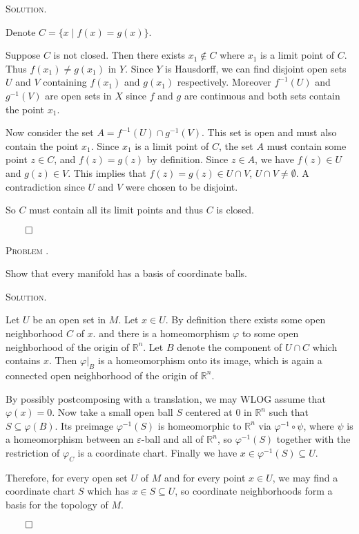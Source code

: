 \documentclass[12pt, a4paper, oneside]{ctexart}
\newcounter{problemname}
\newenvironment{problem}{\begin{framed}\stepcounter{problemname}\par\noindent\textsc{Problem \arabic{problemname}. }}{\end{framed}\par}
\newenvironment{solution}{%
	\par\noindent\textsc{Solution. }\ignorespaces
}{%
	\hfill$\qed$\par
}
\begin{document}
	\begin{solution}
		
		
	Denote $C = \{x \mid f(x) = g(x)\}$.

	Suppose $C$ is not closed. Then there exists  $x_1 \notin C$ where $x_1$ is a limit point of $C$.
    Thus $f(x_1) \neq g(x_1)$ in $Y$. 
	Since $Y$ is Hausdorff, we can find disjoint open sets $U$ and $V$ containing $f(x_1)$ and $g(x_1)$ respectively.
	Moreover $f^{-1}(U)$ and $g^{-1}(V)$ are open sets in $X$ since $f$ and $g$ are continuous and both sets contain the point $x_1$.

	Now consider the set $A = f^{-1}(U) \cap g^{-1}(V)$. This set is open and must also contain the point $x_1$. 
	Since $x_1$ is a limit point of $C$, the set $A$ must contain some point $z \in C$, and $f(z) = g(z)$ by definition.
	Since $z \in A$, we have $f(z) \in U$ and $g(z) \in V$. This implies that 
	$f(z) = g(z) \in U \cap V$, $U \cap V \neq \emptyset$. A contradiction since $U$ and $V$ were chosen to be disjoint.

	So $C$ must contain all its limit points and thus $C$ is closed.
		
		
	\end{solution}
	
	
	
	\begin{problem}
		
	Show that every manifold has a basis of coordinate balls.

	\end{problem}
	
	\begin{solution}
		
		Let \( U \) be an open set in \( M \). Let \( x \in U \). 
		By definition there exists some open neighborhood \( C \) of $x$.
		and there is a homeomorphism \( \varphi \) to some open neighborhood of the origin of 
		\( \mathbb{R}^n \). Let \( B \) denote the component of \( U \cap C \) which contains \( x \). 
		Then \( \varphi |_B \) is a homeomorphism onto its image, 
		which is again a connected open neighborhood of the origin of \( \mathbb{R}^n \). 
		
		By possibly postcomposing with a translation, we may WLOG assume that \( \varphi(x) = 0 \).
		Now take a small open ball \( S \) centered at $0$ in \( \mathbb{R}^n \) 
		such that \( S \subseteq \varphi(B) \). Its preimage \( \varphi^{-1}(S) \) is homeomorphic 
		to \( \mathbb{R}^n \) via \( \varphi^{-1} \circ \psi \), where \( \psi \) is a homeomorphism 
		between an \( \varepsilon \)-ball and all of \( \mathbb{R}^n \), so \( \varphi^{-1}(S) \) 
		together with the restriction of \( \varphi_C \) is a coordinate chart. 
		Finally we have \( x \in \varphi^{-1}(S) \subseteq U \).

		Therefore, for every open set \( U \) of \( M \) and for every point \( x \in U \), 
		we may find a coordinate chart \( S \) which has \( x \in S \subseteq U \), 
		so coordinate neighborhoods form a basis for the topology of \( M \).


	\end{solution}
	
\end{document}
